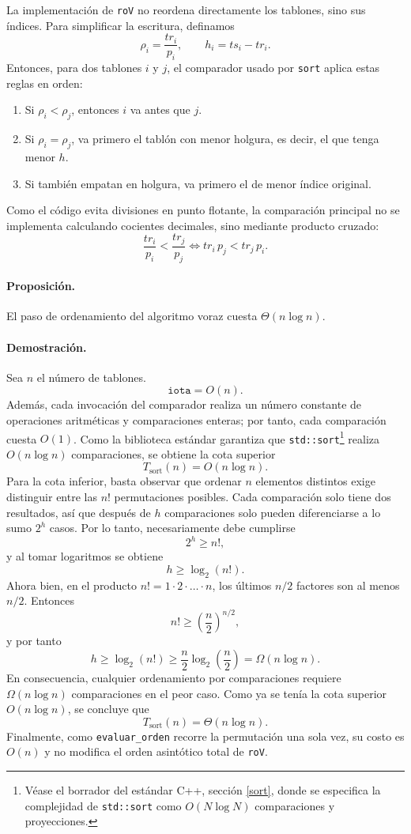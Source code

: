 \documentclass[12pt,a4paper]{article}
\begin{document}
La implementaci\'on de \texttt{roV} no reordena directamente los tablones, sino sus \'indices. Para simplificar la escritura, definamos
\[
\rho_i=\frac{tr_i}{p_i},
\qquad
h_i=ts_i-tr_i.
\]
Entonces, para dos tablones \(i\) y \(j\), el comparador usado por \texttt{sort} aplica estas reglas en orden:
\begin{enumerate}
  \item Si \(\rho_i<\rho_j\), entonces \(i\) va antes que \(j\).
  \item Si \(\rho_i=\rho_j\), va primero el tabl\'on con menor holgura, es decir, el que tenga menor \(h\).
  \item Si tambi\'en empatan en holgura, va primero el de menor \'indice original.
\end{enumerate}

Como el c\'odigo evita divisiones en punto flotante, la comparaci\'on principal no se implementa calculando cocientes decimales, sino mediante producto cruzado:
\[
\frac{tr_i}{p_i}<\frac{tr_j}{p_j}
\iff
tr_i\,p_j < tr_j\,p_i.
\]

\paragraph{Proposici\'on.}
El paso de ordenamiento del algoritmo voraz cuesta \(\Theta(n\log n)\).

\paragraph{Demostraci\'on.}
Sea \(n\) el n\'umero de tablones.
\[
\texttt{iota}=O(n).
\]
Adem\'as, cada invocaci\'on del comparador realiza un n\'umero constante de operaciones aritm\'eticas y comparaciones enteras; por tanto, cada comparaci\'on cuesta \(O(1)\). Como la biblioteca est\'andar garantiza que \texttt{std::sort}\footnote{V\'ease el borrador del est\'andar C++, secci\'on \href{https://eel.is/c++draft/sort}{[sort]}, donde se especifica la complejidad de \texttt{std::sort} como \(O(N\log N)\) comparaciones y proyecciones.} realiza \(O(n\log n)\) comparaciones, se obtiene la cota superior
\[
T_{\text{sort}}(n)=O(n\log n).
\]
Para la cota inferior, basta observar que ordenar \(n\) elementos distintos exige distinguir entre las \(n!\) permutaciones posibles. Cada comparaci\'on solo tiene dos resultados, as\'i que despu\'es de \(h\) comparaciones solo pueden diferenciarse a lo sumo \(2^h\) casos. Por lo tanto, necesariamente debe cumplirse
\[
2^h \ge n!,
\]
y al tomar logaritmos se obtiene
\[
h \ge \log_2(n!).
\]
Ahora bien, en el producto \(n!=1\cdot 2\cdot \dots \cdot n\), los \'ultimos \(n/2\) factores son al menos \(n/2\). Entonces
\[
n! \ge \left(\frac{n}{2}\right)^{n/2},
\]
y por tanto
\[
h \ge \log_2(n!) \ge \frac{n}{2}\log_2\!\left(\frac{n}{2}\right)=\Omega(n\log n).
\]
En consecuencia, cualquier ordenamiento por comparaciones requiere \(\Omega(n\log n)\) comparaciones en el peor caso. Como ya se ten\'ia la cota superior \(O(n\log n)\), se concluye que
\[
T_{\text{sort}}(n)=\Theta(n\log n).
\]
Finalmente, como \texttt{evaluar\_orden} recorre la permutaci\'on una sola vez, su costo es \(O(n)\) y no modifica el orden asint\'otico total de \texttt{roV}.
\end{document}

